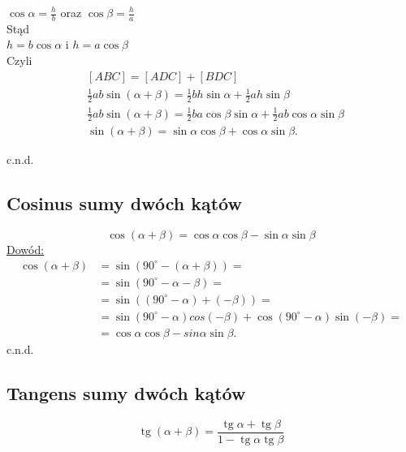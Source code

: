 \documentclass[12pt,a4paper,fleqn]{article}
\DeclareMathOperator{\tg}{tg}
\begin{document}
		$\cos \alpha = \frac{h}{b} $  oraz  $ \cos\beta = \frac{h}{a}$\\
		Stąd\\
		
		$h=b\cos\alpha$  i  $h=a\cos\beta$\\
		Czyli
		\noindent
		\begin{align*}
			&[ABC] = [ADC] + [BDC]\\
			&\frac{1}{2} ab\sin(\alpha+\beta)= \frac{1}{2} bh\sin\alpha + \frac{1}{2} ah\sin\beta\\
			&\frac{1}{2} ab\sin(\alpha+\beta) = \frac{1}{2} ba\cos\beta\sin\alpha + \frac{1}{2} ab\cos\alpha\sin\beta\\	
			&\sin (\alpha +\beta) = \sin\alpha\cos\beta + \cos\alpha\sin\beta.
		\end{align*}
		
		c.n.d.

	\newpage
	\subsection{Cosinus sumy dwóch kątów}
		\begin{equation*}
			\cos (\alpha + \beta) = \cos\alpha\cos\beta - \sin\alpha\sin\beta
		\end{equation*}
		\underline{Dowód:}\noindent
		\begin{align*}
			\cos (\alpha + \beta ) &= \sin (90^\circ-(\alpha + \beta))=\\
									&= \sin (90^\circ - \alpha -\beta )=\\
									&= \sin ((90^\circ -\alpha)+(-\beta))=\\
									&= \sin(90^\circ -\alpha)cos(-\beta) + \cos(90^\circ-\alpha)\sin(-\beta)=\\
									&= \cos\alpha\cos\beta - sin\alpha\sin\beta.
		\end{align*}
		c.n.d.
		\subsection{Tangens sumy dwóch kątów}
		\begin{equation*}
			\tg (\alpha + \beta) = \frac{\tg \alpha + \tg \beta}{1 - \tg \alpha \tg \beta}
		\end{equation*}
		
\end{document}
